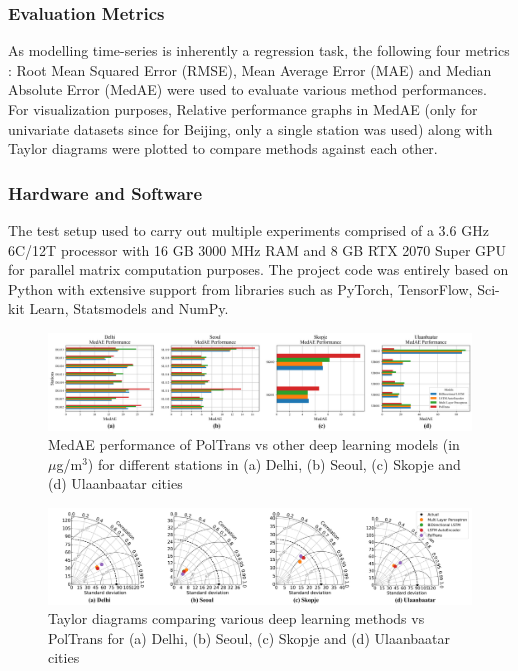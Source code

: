\documentclass[10pt,journal]{IEEEtran}
\begin{document}
\subsubsection{Evaluation Metrics} 
As modelling time-series is inherently a regression task, the following four metrics : Root Mean Squared Error (RMSE), Mean Average Error (MAE) and Median Absolute Error (MedAE) were used to evaluate various method performances. For visualization purposes, Relative performance graphs in MedAE (only for univariate datasets since for Beijing, only a single station was used) along with Taylor diagrams were plotted to compare methods against each other.

\subsubsection{Hardware and Software} 
The test setup used to carry out multiple experiments comprised of a 3.6 GHz 6C/12T processor with 16 GB 3000 MHz RAM and 8 GB RTX 2070 Super GPU for parallel matrix computation purposes. The project code was entirely based on Python with extensive support from libraries such as PyTorch, TensorFlow, Sci-kit Learn, Statsmodels and NumPy.

\begin{figure}[h]
\centering
\includegraphics[scale=0.365]{../paper_figures/dl_medae.png}
\caption{MedAE performance of {PolTrans}  vs other deep learning models (in $\mu$g/m$^{3}$) for different stations in (a) Delhi, (b) Seoul, (c) Skopje and (d) Ulaanbaatar cities}
\label{fig:dl-medae}
\end{figure}

\begin{figure}[h]
\centering
\includegraphics[width=18cm]{../paper_figures/merged_taylor_dl.png}
\caption{Taylor diagrams comparing various deep learning methods vs {PolTrans}  for (a) Delhi, (b) Seoul, (c) Skopje and (d) Ulaanbaatar cities}
\label{fig:dl-taylor}
\end{figure}
\end{document}
